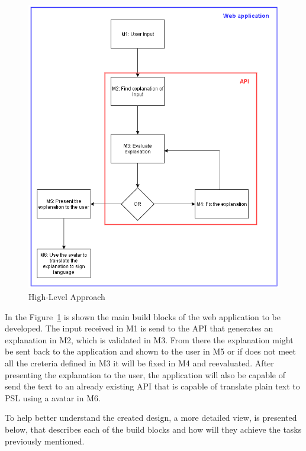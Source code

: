 \begin{figure}[H]
\centering
\includegraphics[scale=0.5]{ch4/assets/diagram1_2.png}
\caption[High-Level Approach]{High-Level Approach}
\label{fig:Diagram1}
\end{figure}

In the Figure~\ref{fig:Diagram1} is shown the main build blocks of the web application to be developed.
The input received in M1 is send to the \gls{API} that generates an explanation in M2, which is validated in M3.
From there the explanation might be sent back to the application and shown to the user in M5  or if does not meet all the creteria defined in M3 it will be fixed in M4 and reevaluated.
After presenting the explanation to the user, the application will also be capable of send the text to an already existing \gls{API} that is capable of translate plain text to \gls{PSL} using a avatar in M6.

To help better understand the created design, a more detailed view, is presented below, that describes each of the build blocks and how will they achieve the tasks previously mentioned.

